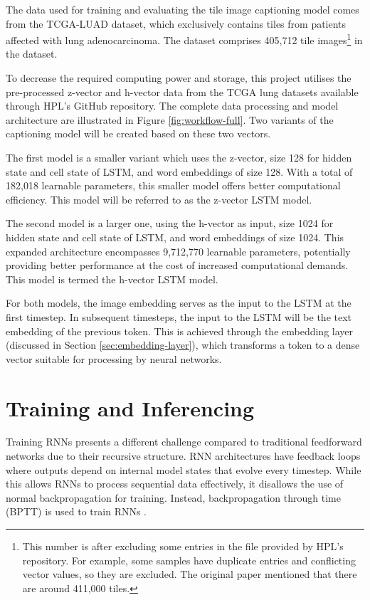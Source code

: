 \documentclass{l4proj}
\begin{document}
The data used for training and evaluating the tile image captioning model comes from the TCGA-LUAD dataset, which exclusively contains tiles from patients affected with lung adenocarcinoma. The dataset comprises 405,712 tile images\footnote{This number is after excluding some entries in the file provided by HPL's repository. For example, some samples have duplicate entries and conflicting vector values, so they are excluded. The original paper mentioned that there are around 411,000 tiles.} in the dataset.

To decrease the required computing power and storage, this project utilises the pre-processed z-vector and h-vector data from the TCGA lung datasets available through HPL's GitHub repository. The complete data processing and model architecture are illustrated in Figure \ref{fig:workflow-full}. Two variants of the captioning model will be created based on these two vectors. 

The first model is a smaller variant which uses the z-vector, size 128 for hidden state and cell state of LSTM, and word embeddings of size 128. With a total of 182,018 learnable parameters, this smaller model offers better computational efficiency. This model will be referred to as the z-vector LSTM model.

The second model is a larger one, using the h-vector as input, size 1024 for hidden state and cell state of LSTM, and word embeddings of size 1024. This expanded architecture encompasses 9,712,770 learnable parameters, potentially providing better performance at the cost of increased computational demands. This model is termed the h-vector LSTM model.

For both models, the image embedding serves as the input to the LSTM at the first timestep. In subsequent timesteps, the input to the LSTM will be the text embedding of the previous token. This is achieved through the embedding layer (discussed in Section \ref{sec:embedding-layer}), which transforms a token to a dense vector suitable for processing by neural networks. 

\section{Training and Inferencing} \label{sec:caption-training}
Training RNNs presents a different challenge compared to traditional feedforward networks due to their recursive structure. RNN architectures have feedback loops where outputs depend on internal model states that evolve every timestep. While this allows RNNs to process sequential data effectively, it disallows the use of normal backpropagation for training. Instead, backpropagation through time (BPTT) is used to train RNNs \citep{bptt}.
\end{document}
